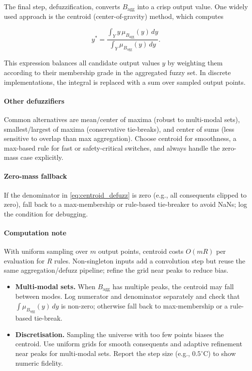 The final step, defuzzification, converts $B_{\text{agg}}$ into a crisp output value. One widely used approach is the centroid (center-of-gravity) method, which computes

\begin{equation}
y^* = \frac{\int_Y y \, \mu_{B_{\text{agg}}}(y) \, dy}{\int_Y \mu_{B_{\text{agg}}}(y) \, dy}.
\label{eq:centroid_defuzz}
\end{equation}

This expression balances all candidate output values $y$ by weighting them according to their membership grade in the aggregated fuzzy set. In discrete implementations, the integral is replaced with a sum over sampled output points.
\paragraph{Other defuzzifiers} Common alternatives are mean/center of maxima (robust to multi-modal sets), smallest/largest of maxima (conservative tie-breaks), and center of sums (less sensitive to overlap than max aggregation). Choose centroid for smoothness, a max-based rule for fast or safety-critical switches, and always handle the zero-mass case explicitly.
\paragraph{Zero-mass fallback} If the denominator in \eqref{eq:centroid_defuzz} is zero (e.g., all consequents clipped to zero), fall back to a max-membership or rule-based tie-breaker to avoid NaNs; log the condition for debugging.
\paragraph{Computation note} With uniform sampling over \(m\) output points, centroid costs \(O(mR)\) per evaluation for \(R\) rules. Non-singleton inputs add a convolution step but reuse the same aggregation/defuzz pipeline; refine the grid near peaks to reduce bias.

\begin{tcolorbox}[pitfallbox, title={Centroid stability and tie-breaking}]
\begin{itemize}
    \item \textbf{Multi-modal sets.} When $B_{\text{agg}}$ has multiple peaks, the centroid may fall between modes. Log numerator and denominator separately and check that $\int \mu_{B_{\text{agg}}}(y)\, dy$ is non-zero; otherwise fall back to max-membership or a rule-based tie-break.
    \item \textbf{Discretisation.} Sampling the universe with too few points biases the centroid. Use uniform grids for smooth consequents and adaptive refinement near peaks for multi-modal sets. Report the step size (e.g., $0.5^\circ$C) to show numeric fidelity.
\end{itemize}
\end{tcolorbox}

